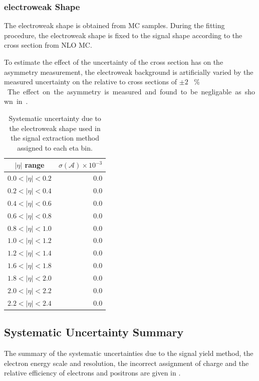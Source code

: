 \subsubsection{electroweak \ETm Shape}

The {electroweak} shape is obtained from {MC} samples. During the fitting
procedure, the {electroweak} shape is fixed to the \Wenu signal shape according to
the cross section from NLO {MC}.

To estimate the effect of the uncertainty of the cross section has on the
asymmetry measurement, the {electroweak} background is artificially varied by the
measured uncertainty on the relative \PW to \PZ cross sections of \unit{$\pm2$}{
\% }. The effect on the asymmetry is measured and found to be negligable as
shown in .

\begin{table}[htbp]
\begin{center}
\begin{tabular}{cr}
\toprule
$|\eta|$ range & $\sigma(\mathcal{A}) \times 10^{-3}$\\
\midrule
$0.0<|\eta|<0.2$ & 0.0\\
$0.2<|\eta|<0.4$ & 0.0\\
$0.4<|\eta|<0.6$ & 0.0\\
$0.6<|\eta|<0.8$ & 0.0\\
$0.8<|\eta|<1.0$ & 0.0\\
$1.0<|\eta|<1.2$ & 0.0\\
$1.2<|\eta|<1.4$ & 0.0\\
$1.6<|\eta|<1.8$ & 0.0\\
$1.8<|\eta|<2.0$ & 0.0\\
$2.0<|\eta|<2.2$ & 0.0\\
$2.2<|\eta|<2.4$ & 0.0\\
\bottomrule
\end{tabular}
\caption{\label{tab:updatedsystewk}Systematic uncertainty due to the electroweak
\MET shape used in the signal extraction method assigned to each eta bin.}
\end{center}
\end{table}

\subsection{Systematic Uncertainty Summary}
The summary of the systematic uncertainties due to the signal yield method, the
electron energy scale and resolution, the incorrect assignment of charge and the
relative efficiency of electrons and positrons are given in
.

